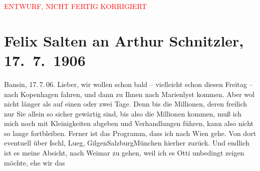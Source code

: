 
\begin{center}
            \textcolor{red}{ENTWURF, NICHT FERTIG KORRIGIERT}
                      \end{center}
            
         
         \renewcommand{\erwaehntePersonen}{Personen: Ottilie Salten, Olga Schnitzler}
         \renewcommand{\erwaehnteOrte}{Orte: Bad Ischl, Bansin, Deutschland, Kopenhagen, Lueg am Wolfgangsee, Marienlyst, München, Salzburg, St. Gilgen, Weimar, Wien}
         \renewcommand{\erwaehnteWerke}{}
               \section[Felix Salten an Arthur Schnitzler, 17. 7. 1906]{ Felix Salten an Arthur Schnitzler, 17. 7. 1906}\nopagebreak{}\rehead{ }\begin{ledgroupsized}[t]{13cm}\normalsize\beginnumbering \toendnotes[C]{\smallbreak\pagebreak[2]} 
\toendnotes[C]{\smallbreak}\pstart
           \raggedleft{}{\pb}Bansin, 17. 7. 06. \pend
           \pstart
           Lieber, wir wollen schon bald – vielleicht schon diesen
                  Freitag – nach Kopenhagen
               fahren, und dann zu Ihnen nach Marienlyst kommen.
               Aber wol nicht länger als auf einen oder zwei Tage. Denn bis die Millionen, deren
               freilich nur Sie allein so sicher gewärtig sind, bis also die Millionen kommen, muß
               ich mich noch mit Kleinigkeiten abgeben und Verhandlungen führen, kann also nicht so
               lange fortbleiben. Ferner ist das Programm, dass ich nach Wien gehe. Von dort eventuell über Ischl, Lueg, GilgenSalzburgMünchen hierher zurück. Und endlich ist es
               meine Absicht, nach Weimar zu gehen, weil ich es
                  Otti unbedingt zeigen möchte, ehe wir das

\end{ledgroupsized}
